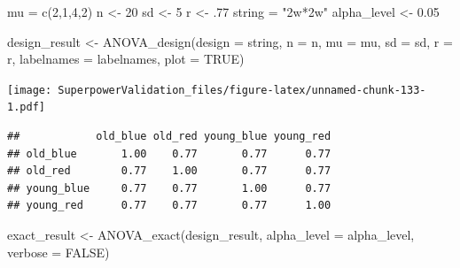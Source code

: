 \documentclass[
]{book}
\newenvironment{Shaded}{\begin{snugshade}}{\end{snugshade}}
\newcommand{\AttributeTok}[1]{\textcolor[rgb]{0.77,0.63,0.00}{#1}}
\newcommand{\ConstantTok}[1]{\textcolor[rgb]{0.00,0.00,0.00}{#1}}
\newcommand{\DecValTok}[1]{\textcolor[rgb]{0.00,0.00,0.81}{#1}}
\newcommand{\FloatTok}[1]{\textcolor[rgb]{0.00,0.00,0.81}{#1}}
\newcommand{\FunctionTok}[1]{\textcolor[rgb]{0.00,0.00,0.00}{#1}}
\newcommand{\NormalTok}[1]{#1}
\newcommand{\OtherTok}[1]{\textcolor[rgb]{0.56,0.35,0.01}{#1}}
\newcommand{\SpecialCharTok}[1]{\textcolor[rgb]{0.00,0.00,0.00}{#1}}
\newcommand{\StringTok}[1]{\textcolor[rgb]{0.31,0.60,0.02}{#1}}
\begin{document}
\begin{Shaded}
\begin{Highlighting}[]
\NormalTok{mu }\OtherTok{=} \FunctionTok{c}\NormalTok{(}\DecValTok{2}\NormalTok{,}\DecValTok{1}\NormalTok{,}\DecValTok{4}\NormalTok{,}\DecValTok{2}\NormalTok{) }
\NormalTok{n }\OtherTok{\textless{}{-}} \DecValTok{20}
\NormalTok{sd }\OtherTok{\textless{}{-}} \DecValTok{5}
\NormalTok{r }\OtherTok{\textless{}{-}}\NormalTok{ .}\DecValTok{77}
\NormalTok{string }\OtherTok{=} \StringTok{"2w*2w"}
\NormalTok{alpha\_level }\OtherTok{\textless{}{-}} \FloatTok{0.05}


\NormalTok{design\_result }\OtherTok{\textless{}{-}} \FunctionTok{ANOVA\_design}\NormalTok{(}\AttributeTok{design =}\NormalTok{ string,}
                              \AttributeTok{n =}\NormalTok{ n, }
                              \AttributeTok{mu =}\NormalTok{ mu, }
                              \AttributeTok{sd =}\NormalTok{ sd, }
                              \AttributeTok{r =}\NormalTok{ r, }
                              \AttributeTok{labelnames =}\NormalTok{ labelnames,}
                              \AttributeTok{plot =} \ConstantTok{TRUE}\NormalTok{)}
\end{Highlighting}
\end{Shaded}

\texttt{[image: SuperpowerValidation\_files/figure-latex/unnamed-chunk-133-1.pdf]}

\begin{Shaded}
\end{Shaded}

\begin{verbatim}
##            old_blue old_red young_blue young_red
## old_blue       1.00    0.77       0.77      0.77
## old_red        0.77    1.00       0.77      0.77
## young_blue     0.77    0.77       1.00      0.77
## young_red      0.77    0.77       0.77      1.00
\end{verbatim}

\begin{Shaded}
\begin{Highlighting}[]
\NormalTok{exact\_result }\OtherTok{\textless{}{-}} \FunctionTok{ANOVA\_exact}\NormalTok{(design\_result,}
                            \AttributeTok{alpha\_level =}\NormalTok{ alpha\_level,}
                            \AttributeTok{verbose =} \ConstantTok{FALSE}\NormalTok{)}
\end{Highlighting}
\end{Shaded}
\end{document}
